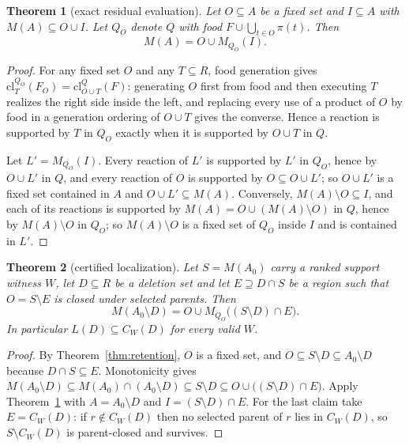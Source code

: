 \documentclass[11pt,a4paper]{article}
\theoremstyle{plain}
\newtheorem{theorem}{Theorem}[section]
\theoremstyle{definition}
\theoremstyle{remark}
\newcommand{\cl}{\mathrm{cl}}
\begin{document}
\begin{theorem}[exact residual evaluation]\label{thm:residual}
Let $O\subseteq A$ be a fixed set and $I\subseteq A$ with $M(A)\subseteq O\cup I$. Let $Q_O$ denote $Q$ with food $F\cup\bigcup_{t\in O}\pi(t)$. Then
\[
M(A)=O\cup M_{Q_O}(I).
\]
\end{theorem}

\begin{proof}
For any fixed set $O$ and any $T\subseteq R$, food generation gives $\cl^{Q_O}_{T}(F_O)=\cl^{Q}_{O\cup T}(F)$: generating $O$ first from food and then executing $T$ realizes the right side inside the left, and replacing every use of a product of $O$ by food in a generation ordering of $O\cup T$ gives the converse. Hence a reaction is supported by $T$ in $Q_O$ exactly when it is supported by $O\cup T$ in $Q$.

Let $L'=M_{Q_O}(I)$. Every reaction of $L'$ is supported by $L'$ in $Q_O$, hence by $O\cup L'$ in $Q$, and every reaction of $O$ is supported by $O\subseteq O\cup L'$; so $O\cup L'$ is a fixed set contained in $A$ and $O\cup L'\subseteq M(A)$. Conversely, $M(A)\setminus O\subseteq I$, and each of its reactions is supported by $M(A)=O\cup(M(A)\setminus O)$ in $Q$, hence by $M(A)\setminus O$ in $Q_O$; so $M(A)\setminus O$ is a fixed set of $Q_O$ inside $I$ and is contained in $L'$.
\end{proof}

\begin{theorem}[certified localization]\label{thm:localization}
Let $S=M(A_0)$ carry a ranked support witness $W$, let $D\subseteq R$ be a deletion set and let $E\supseteq D\cap S$ be a region such that $O=S\setminus E$ is closed under selected parents. Then
\[
M(A_0\setminus D)=O\cup M_{Q_O}\big((S\setminus D)\cap E\big).
\]
In particular $L(D)\subseteq C_W(D)$ for every valid $W$.
\end{theorem}

\begin{proof}
By Theorem~\ref{thm:retention}, $O$ is a fixed set, and $O\subseteq S\setminus D\subseteq A_0\setminus D$ because $D\cap S\subseteq E$. Monotonicity gives $M(A_0\setminus D)\subseteq M(A_0)\cap(A_0\setminus D)\subseteq S\setminus D\subseteq O\cup\big((S\setminus D)\cap E\big)$. Apply Theorem~\ref{thm:residual} with $A=A_0\setminus D$ and $I=(S\setminus D)\cap E$. For the last claim take $E=C_W(D)$: if $r\notin C_W(D)$ then no selected parent of $r$ lies in $C_W(D)$, so $S\setminus C_W(D)$ is parent-closed and survives.
\end{proof}
\end{document}
